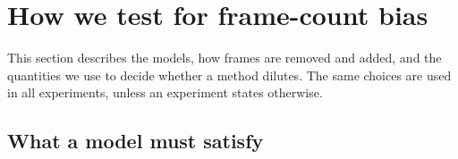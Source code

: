 \section{How we test for frame-count bias}
\label{sec:setup}


This section describes the models, how frames are removed and added, and the quantities we use to decide whether a method dilutes.
The same choices are used in all experiments, unless an experiment states otherwise.

\subsection{What a model must satisfy}
\label{sec:requirements}

